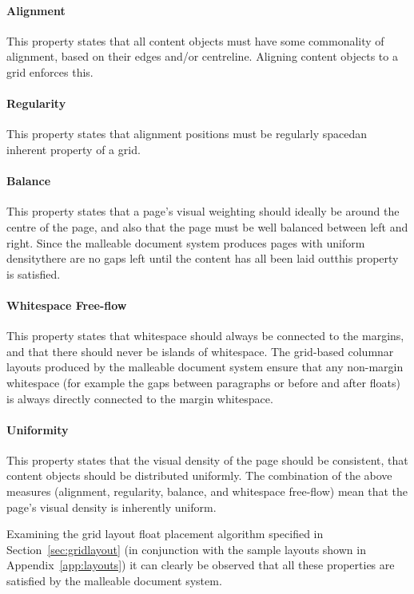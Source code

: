 \paragraph{Alignment} This property states that all content objects must have some commonality of alignment, based on their edges and/or centreline. Aligning content objects to a grid enforces this.

\paragraph{Regularity} This property states that alignment positions must be regularly spaced\ed an inherent property of a grid.

\paragraph{Balance} This property states that a page's visual weighting should ideally be around the centre of the page, and also that the page must be well balanced between left and right. Since the malleable document system produces pages with uniform density\ed there are no gaps left until the content has all been laid out\ed this property is satisfied.

\paragraph{Whitespace Free-flow} This property states that whitespace should always be connected to the margins, and that there should never be islands of whitespace. The grid-based columnar layouts produced by the malleable document system ensure that any non-margin whitespace (for example the gaps between paragraphs or before and after floats) is always directly connected to the margin whitespace.

\paragraph{Uniformity} This property states that the visual density of the page should be consistent, \ie{} that content objects should be distributed uniformly. The combination of the above measures (alignment, regularity, balance, and whitespace free-flow) mean that the page's visual density is inherently uniform.

\vspace{2em}
Examining the grid layout float placement algorithm specified in Section~\ref{sec:gridlayout} (in conjunction with the sample layouts shown in Appendix~\ref{app:layouts}) it can clearly be observed that all these properties are satisfied by the malleable document system.

